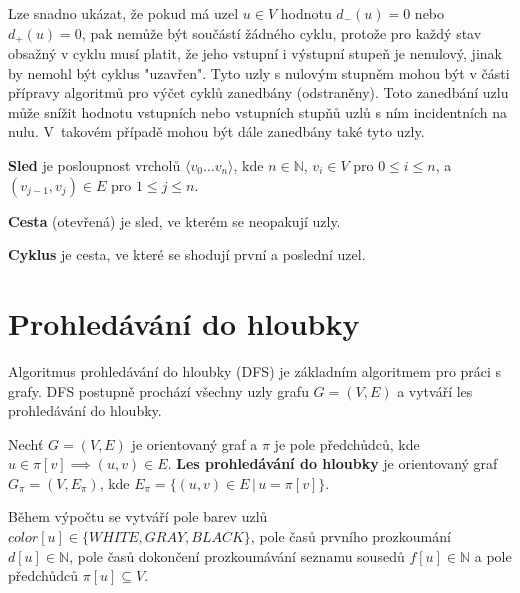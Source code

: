         \vspace*{1em}
        Lze snadno ukázat, že pokud má uzel $u \in V$ hodnotu $d_-(u) = 0$ nebo $d_+(u) = 0$, pak nemůže být součástí žádného cyklu, protože pro každý stav obsažný v cyklu musí platit, že jeho vstupní i výstupní stupeň je nenulový, jinak by nemohl být cyklus "uzavřen". Tyto uzly s nulovým stupněm mohou být v části přípravy algoritmů pro výčet cyklů zanedbány (odstraněny). Toto zanedbání uzlu může snížit hodnotu vstupních nebo vstupních stupňů uzlů s ním incidentních na nulu. V~takovém případě mohou být dále zanedbány také tyto uzly.

        \begin{definition}
            \textbf{Sled} je posloupnost vrcholů $\langle v_0 \dots v_n\rangle$, kde $n \in \mathbb{N}$, $v_i \in V$ pro $0 \leq i \leq n$, a $(v_{j-1}, v_j) \in E$ pro $1 \leq j \leq n$.
        \end{definition}

        \begin{definition}
            \textbf{Cesta} (otevřená) je sled, ve kterém se neopakují uzly.
        \end{definition}

        \begin{definition}
            \textbf{Cyklus} je cesta, ve které se shodují první a poslední uzel.
        \end{definition}

    \section{Prohledávání do hloubky}
        Algoritmus prohledávání do hloubky (DFS) je základním algoritmem pro práci s grafy. DFS postupně prochází všechny uzly grafu $G = (V, E)$ a vytváří les prohledávání do hloubky.

        \begin{definition}
            Nechť $G = (V, E)$ je orientovaný graf a $\pi$ je pole předchůdců, kde $u \in \pi[v] \implies (u, v) \in E$. \textbf{Les prohledávání do hloubky} je orientovaný graf $G_\pi = (V, E_\pi)$, kde $E_\pi = \{(u, v) \in E\,|\, u = \pi[v]\}$.
        \end{definition}

        \vspace*{1em}
        Během výpočtu se vytváří pole barev uzlů $color[u] \in \{\mathit{WHITE, GRAY, BLACK}\}$, pole časů prvního prozkoumání $d[u] \in \mathbb{N}$, pole časů dokončení prozkoumávání seznamu sousedů $f[u] \in \mathbb{N}$ a pole předchůdců $\pi[u] \subseteq V$.

